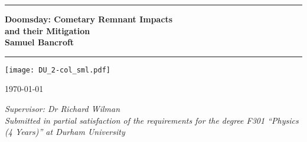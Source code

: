 \documentclass[12pt]{book}
\begin{document}
{\let\cleardoublepage\clearpage 

\titlepage


{
  \thispagestyle{empty}
  {\parindent0cm
   \rule{\linewidth}{.7ex}}
  \begin{flushright}

    \sffamily\bfseries\Huge
    Doomsday: Cometary Remnant Impacts\\and their Mitigation\\
    \sffamily\bfseries\large
    Samuel Bancroft
  \end{flushright}
  \rule{\linewidth}{.7ex}
  
\vspace{3ex}
\small{
\begin{center}%
  {\bfseries \vspace{-.5em}{Abstract}}%
\end{center}%
\vspace{-3ex}
\noindent \quotation{\lipsum[100]}
}

  \begin{center}
    \texttt{[image: DU\_2-col\_sml.pdf]}
  \end{center}
  \begin{center}\sffamily\LARGE{\today}\end{center}

  \thispagestyle{empty}

  \begin{center}
  \large \emph{Supervisor: Dr Richard Wilman}\\
  \vspace{5ex}
  \emph{Submitted in partial satisfaction of the requirements for the degree
F301 ``Physics (4 Years)'' at Durham University}
  \end{center}
}

\endtitlepage

  \tableofcontents

  \mainmatter\setcounter{page}{1}
  
  


  \backmatter
  
  \markboth{}{}


} %
\end{document}
